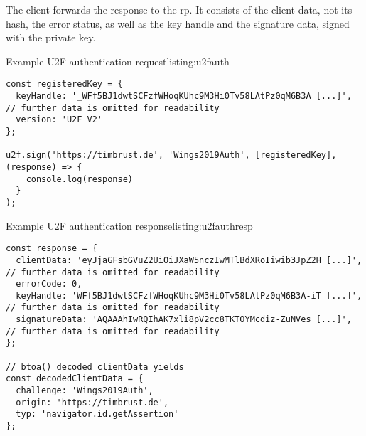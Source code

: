 The client forwards the response to the \gls{rp}. It consists of the client data, not its hash, the error status, as well as the key handle and the signature data, signed with the private key. 

\begin{example}{Example U2F authentication request}{listing:u2fauth}
\begin{verbatim}
const registeredKey = {
  keyHandle: '_WFf5BJ1dwtSCFzfWHoqKUhc9M3Hi0Tv58LAtPz0qM6B3A [...]', // further data is omitted for readability
  version: 'U2F_V2'
};

u2f.sign('https://timbrust.de', 'Wings2019Auth', [registeredKey], (response) => {
    console.log(response)
  }
);
\end{verbatim}
\end{example}

\begin{example}{Example U2F authentication response}{listing:u2fauthresp}
\begin{verbatim}
const response = {
  clientData: 'eyJjaGFsbGVuZ2UiOiJXaW5nczIwMTlBdXRoIiwib3JpZ2H [...]', // further data is omitted for readability
  errorCode: 0,
  keyHandle: 'WFf5BJ1dwtSCFzfWHoqKUhc9M3Hi0Tv58LAtPz0qM6B3A-iT [...]', // further data is omitted for readability
  signatureData: 'AQAAAhIwRQIhAK7xli8pV2cc8TKTOYMcdiz-ZuNVes [...]', // further data is omitted for readability
};

// btoa() decoded clientData yields
const decodedClientData = {
  challenge: 'Wings2019Auth',
  origin: 'https://timbrust.de',
  typ: 'navigator.id.getAssertion'
};
\end{verbatim}
\end{example}
